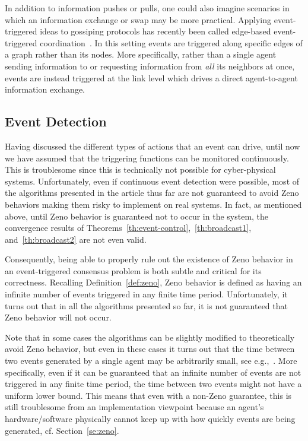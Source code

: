 \documentclass{autart}
\begin{document}
In addition to information pushes or pulls, one could also imagine
scenarios in which an information exchange or swap may be more
practical. Applying event-triggered ideas to gossiping protocols has
recently been called edge-based event-triggered
coordination~\citep{CDP-PF:13,CDP-RP:17,MC-FX-LW:15,WX-DWCH-JZ-BC:16,BW-FX-MD:17,GD-FX-LW:17}. In
this setting events are triggered along specific edges of a graph
rather than its nodes. More specifically, rather than a single agent
sending information to or requesting information from \emph{all} its
neighbors at once, events are instead triggered at the link level
which drives a direct agent-to-agent information exchange.


\subsection{\textbf{Event Detection}}\label{se:triggereval}

Having discussed the different types of actions that an event can
drive, until now we have assumed that the triggering functions can be
monitored continuously.  This is troublesome since this is technically
not possible for cyber-physical systems.  Unfortunately, even if
continuous event detection were possible, most of the algorithms
presented in the article thus far are not guaranteed to avoid Zeno
behaviors making them risky to implement on real systems. In fact, as
mentioned above, until Zeno behavior is guaranteed not to
occur in the system, the convergence results of
Theorems~\ref{th:event-control},~\ref{th:broadcast1},
and~\ref{th:broadcast2} are not even valid.

Consequently, being able to properly rule out the existence of Zeno
behavior in an event-triggered consensus problem is both subtle and
critical for its correctness. Recalling Definition~\ref{def:zeno},
Zeno behavior is defined as having an infinite number of events
triggered in any finite time period. Unfortunately, it turns out that
in all the algorithms presented so far, it is not guaranteed that
Zeno behavior will not occur.

Note that in some cases the algorithms can be slightly modified to
theoretically avoid Zeno behavior, but even in these cases it turns
out that the time between two events generated by a single agent may
be arbitrarily small, see e.g.,~\cite{CN-JC:16-auto}. {More
  specifically, even if it can be guaranteed that an infinite number
  of events are not triggered in any finite time period, the time
  between two events might not have a uniform lower bound. This means
  that even with a non-Zeno guarantee, this is still troublesome from
  an implementation viewpoint because an agent's hardware/software
  physically cannot keep up with how quickly events are being
  generated, cf. Section~\ref{se:zeno}.  }
\end{document}
